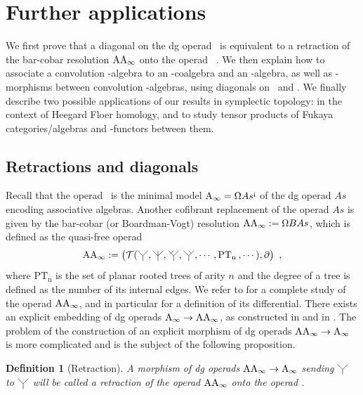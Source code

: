 \documentclass[10pt]{amsart}
\newtheorem{definition}{Definition}[section]
\theoremstyle{remark}
\begin{document}

\section{Further applications} \label{sec:V}

We first prove that a diagonal on the dg operad \Ainf\ is equivalent to a retraction of the bar-cobar resolution $\mathrm{AA}_\infty$ onto the operad \Ainf\ . 
We then explain how to associate a convolution \Ainf -algebra to an \Ainf -coalgebra and an \Ainf -algebra, as well as \Ainf -morphisms between convolution \Ainf -algebras, using diagonals on \Ainf\ and \Minf .
We finally describe two possible applications of our results in symplectic topology: in the context of Heegard Floer homology, and to study tensor products of Fukaya categories/algebras and \Ainf -functors between them.

\subsection{Retractions and diagonals} \label{ss:retract-diag}

Recall that the operad \Ainf\ is the minimal model $\mathrm{A}_\infty =\Omega As^{\text{!`}}$ of the dg operad $As$ encoding associative algebras. 
Another cofibrant replacement of the operad $As$ is given by the bar-cobar (or Boardman-Vogt) resolution $\mathrm{AA}_\infty := \Omega B As$, which is defined as the quasi-free operad 
\[ \AAinf := \left( \mathcal{T} (\premiertermecobarbarA , \premiertermecobarbarD , \premiertermecobarbarB , \premiertermecobarbarC , \cdots , \mathrm{PT_n} \text{\hspace{2pt}}, \cdots ) , \partial \right) \ , \] 
where $\mathrm{PT_n}$ is the set of planar rooted trees of arity $n$ and the degree of a tree is defined as the number of its internal edges.
We refer to \cite[Section 9.3]{LodayVallette12} for a complete study of the operad $\mathrm{AA}_\infty$, and in particular for a definition of its differential.
There exists an explicit embedding of dg operads $\mathrm{A}_\infty \rightarrow \mathrm{AA}_\infty$, as constructed in \cite[Section 4]{MarklShnider06} and in \cite[Section 1.3.1.5]{mazuir-I}.
The problem of the construction of an explicit morphism of dg operads $\mathrm{AA}_\infty \rightarrow \mathrm{A}_\infty$ is more complicated and is the subject of the following proposition. 

\begin{definition}[Retraction]
A morphism of dg operads $\mathrm{AA}_\infty \rightarrow \mathrm{A}_\infty$ sending $\premiertermecobarbarA$ to $\premiertermecobarbarA$ will be called a \emph{retraction of the operad $\mathrm{AA}_\infty$ onto the operad \Ainf }.
\end{definition}
\end{document}
